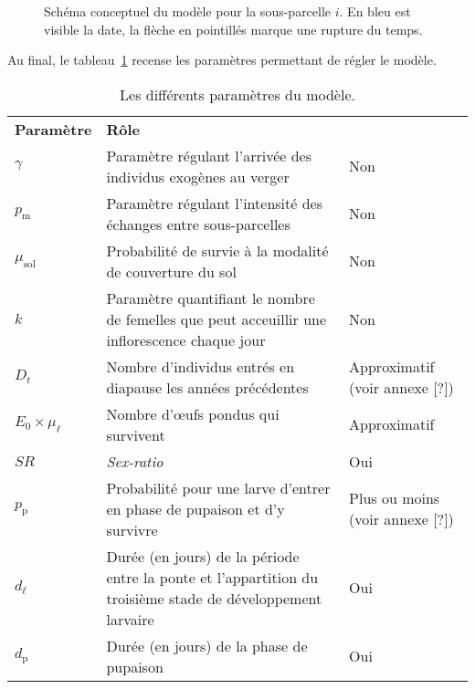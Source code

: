 \begin{figure}[ht]
 \caption{Schéma conceptuel du modèle pour la sous-parcelle $i$. En bleu est visible la date, la flèche en pointillés marque une rupture du temps.}
 \label{fig:schema}
\end{figure}


Au final, le tableau~\ref{tab:param} recense les paramètres permettant de régler le modèle.

\begin{table}
\caption{Les différents paramètres du modèle.}
\label{tab:param}
\centering
{\small
\begin{tabular}{p{1.85cm}p{8.9cm}p{3cm}}
\textbf{Paramètre} & \textbf{Rôle} & \textbf{\raggedright Valeur présente dans la littérature}\\
$\gamma$ & Paramètre régulant l'arrivée des individus exogènes au verger & Non\\
$p_{\text{m}}$ & Paramètre régulant l'intensité des échanges entre sous-parcelles & Non\\
$\mu_{\text{sol}}$ & Probabilité de survie à la modalité de couverture du sol & Non\\
$k$ & Paramètre quantifiant le nombre de femelles que peut acceuillir une inflorescence chaque jour & Non\\
$D_t$ & Nombre d'individus entrés en diapause les années précédentes & {\raggedright Approximatif (voir annexe [?])} \\
$E_0 \times \mu_{\ell}$ & Nombre d'œufs pondus qui survivent & Approximatif\\
$\mathit{SR}$ & \textit{Sex-ratio} & Oui\\
$p_{\text{p}}$ & Probabilité pour une larve d'entrer en phase de pupaison et d'y survivre & {\raggedright Plus ou moins (voir annexe [?])}\\
$d_{\ell}$ & Durée (en jours) de la période entre la ponte et l'appartition du troisième stade de développement larvaire & Oui\\
$d_{\text{p}}$ & Durée (en jours) de la phase de pupaison & Oui
\end{tabular}
}
\end{table}

